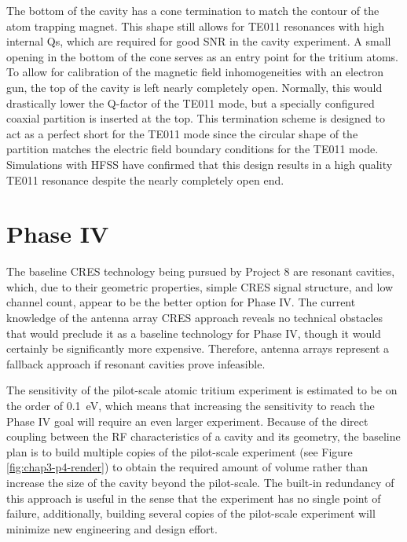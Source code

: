 The bottom of the cavity has a cone termination to match the contour of the atom trapping magnet. This shape still allows for TE011 resonances with high internal Qs, which are required for good SNR in the cavity experiment. A small opening in the bottom of the cone serves as an entry point for the tritium atoms. To allow for calibration of the magnetic field inhomogeneities with an electron gun, the top of the cavity is left nearly completely open. Normally, this would drastically lower the Q-factor of the TE011 mode, but a specially configured coaxial partition is inserted at the top. This termination scheme is designed to act as a perfect short for the TE011 mode since the circular shape of the partition matches the electric field boundary conditions for the TE011 mode. Simulations with HFSS have confirmed that this design results in a high quality TE011 resonance despite the nearly completely open end.

\section{Phase IV}

The baseline CRES technology being pursued by Project 8 are resonant cavities, which, due to their geometric properties, simple CRES signal structure, and low channel count, appear to be the better option for Phase IV. The current knowledge of the antenna array CRES approach reveals no technical obstacles that would preclude it as a baseline technology for Phase IV, though it would certainly be significantly more expensive. Therefore, antenna arrays represent a fallback approach if resonant cavities prove infeasible.

The sensitivity of the pilot-scale atomic tritium experiment is estimated to be on the order of 0.1~eV, which means that increasing the sensitivity to reach the Phase IV goal will require an even larger experiment. Because of the direct coupling between the RF characteristics of a cavity and its geometry, the baseline plan is to build multiple copies of the pilot-scale experiment (see Figure \ref{fig:chap3-p4-render}) to obtain the required amount of volume rather than increase the size of the cavity beyond the pilot-scale. The built-in redundancy of this approach is useful in the sense that the experiment has no single point of failure, additionally, building several copies of the pilot-scale experiment will minimize new engineering and design effort.

